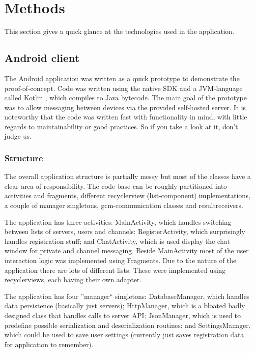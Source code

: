 \section{Methods}
This section gives a quick glance at the technologies used in the application.

\subsection{Android client}
The Android application was written as a quick prototype to demonstrate the proof-of-concept. Code was written using the native SDK and a JVM-language called Kotlin \cite{kotlin}, which compiles to Java bytecode. The main goal of the prototype was to allow messaging between devices via the provided self-hosted server. It is noteworthy that the code was written fast with functionality in mind, with little regards to maintainability or good practices. So if you take a look at it, don't judge us.

\subsubsection{Structure}

The overall application structure is partially messy but most of the classes have a clear area of responsibility. The code base can be roughly partitioned into activities and fragments, different recyclerview (list-component) implementations, a couple of manager singletons, gcm-communication classes and resultreceivers.

The application has three activities: MainActivity, which handles switching between lists of servers, users and channels; RegisterActivity, which surprisingly handles registration stuff; and ChatActivity, which is used display the chat window for private and channel messaging. Beside MainActivity most of the user interaction logic was implemented using Fragments. Due to the nature of the application there are lots of different lists. These were implemented using recyclerviews, each having their own adapter.

The application has four ''manager`` singletons: DatabaseManager, which handles data persistence (basically just servers); HttpManager, which is a bloated badly designed class that handles calls to server API; JsonManager, which is used to predefine possible serialization and deserialization routines; and SettingsManager, which could be used to save user settings (currently just saves registration data for application to remember). 


